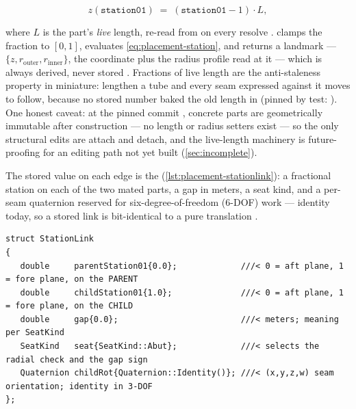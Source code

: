 \begin{equation}\label{eq:placement-station}
z(\mathtt{station01}) \;=\; (\mathtt{station01} - 1)\cdot L ,
\end{equation}

where $L$ is the part's \emph{live} length, re-read from  on every
resolve .  clamps the fraction to
$[0,1]$, evaluates \cref{eq:placement-station}, and returns a  landmark ---
$\{z, r_{\mathrm{outer}}, r_{\mathrm{inner}}\}$, the coordinate plus the radius profile
read at it --- which is always derived, never stored .
Fractions of live length are the anti-staleness property in miniature: lengthen a tube and
every seam expressed against it moves to follow, because no stored number baked the old
length in (pinned by test: ). One honest
caveat: at the pinned commit , concrete parts are geometrically immutable
after construction --- no length or radius setters exist 
--- so the only structural edits are attach and detach, and the live-length machinery is
future-proofing for an editing path not yet built (\cref{sec:incomplete}).

The stored value on each edge is the 
(\cref{lst:placement-stationlink}): a fractional station on each of the two mated parts, a
gap in meters, a seat kind, and a per-seam quaternion reserved for six-degree-of-freedom
(6-DOF) work --- identity today, so a stored link is bit-identical to a pure translation
.

\begin{listing}[htbp]
\begin{verbatim}
struct StationLink
{
   double     parentStation01{0.0};             ///< 0 = aft plane, 1 = fore plane, on the PARENT
   double     childStation01{1.0};              ///< 0 = aft plane, 1 = fore plane, on the CHILD
   double     gap{0.0};                         ///< meters; meaning per SeatKind
   SeatKind   seat{SeatKind::Abut};             ///< selects the radial check and the gap sign
   Quaternion childRot{Quaternion::Identity()}; ///< (x,y,z,w) seam orientation; identity in 3-DOF
};
\end{verbatim}
\caption{The only stored spatial relationship in the model .
The defaults are load-bearing: a default-constructed link means ``child fore plane abuts
parent aft plane,'' the natural nose$\to$body$\to$fins build order, so the common case
costs zero authored numbers.}\label{lst:placement-stationlink}
\end{listing}

